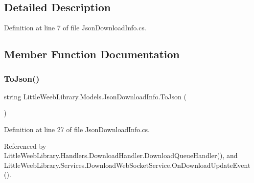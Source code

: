 \subsection{Detailed Description}


Definition at line 7 of file Json\+Download\+Info.\+cs.



\subsection{Member Function Documentation}
\mbox{\label{class_little_weeb_library_1_1_models_1_1_json_download_info_a3fd450e7e2de8b9a936ba3b2cbeeaccb}} 
\subsubsection{\texorpdfstring{To\+Json()}{ToJson()}}
{\footnotesize\ttfamily string Little\+Weeb\+Library.\+Models.\+Json\+Download\+Info.\+To\+Json (\begin{DoxyParamCaption}{ }\end{DoxyParamCaption})}



Definition at line 27 of file Json\+Download\+Info.\+cs.



Referenced by Little\+Weeb\+Library.\+Handlers.\+Download\+Handler.\+Download\+Queue\+Handler(), and Little\+Weeb\+Library.\+Services.\+Download\+Web\+Socket\+Service.\+On\+Download\+Update\+Event().


